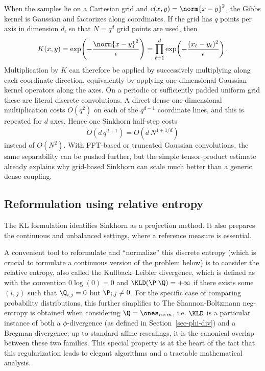 \begin{rem}\label{rem-sinkhorn-separable-gaussian}
	When the samples lie on a Cartesian grid and $c(x,y)=\norm{x-y}^2$, the Gibbs kernel is Gaussian and factorizes along coordinates. If the grid has $q$ points per axis in dimension $d$, so that $N=q^d$ grid points are used, then
	\[
		K(x,y)=\exp\!\left(-\frac{\norm{x-y}^2}{\epsilon}\right)
		=
		\prod_{\ell=1}^d
		\exp\!\left(-\frac{(x_\ell-y_\ell)^2}{\epsilon}\right).
	\]
	Multiplication by $K$ can therefore be applied by successively multiplying along each coordinate direction, equivalently by applying one-dimensional Gaussian kernel operators along the axes. On a periodic or sufficiently padded uniform grid these are literal discrete convolutions. A direct dense one-dimensional multiplication costs $O(q^2)$ on each of the $q^{d-1}$ coordinate lines, and this is repeated for $d$ axes. Hence one Sinkhorn half-step costs
	\[
		O(d\,q^{d+1})=O(d\,N^{1+1/d})
	\]
	instead of $O(N^2)$. With FFT-based or truncated Gaussian convolutions, the same separability can be pushed further, but the simple tensor-product estimate already explains why grid-based Sinkhorn can scale much better than a generic dense coupling.
\end{rem}


\subsection{Reformulation using relative entropy}

The KL formulation identifies Sinkhorn as a projection method. It also prepares the continuous and unbalanced settings, where a reference measure is essential.

A convenient tool to reformulate and ``normalize'' this discrete entropy (which is crucial to formulate a continuous version of the problem below) is to consider the relative entropy, also called the Kullback--Leibler divergence, which is defined as
with the convention $0\log(0)=0$ and $\KLD(\P|\Q)=+\infty$ if there exists some $(i,j)$ such that $\Q_{i,j}=0$ but $\P_{i,j} \neq 0$.
%
For the specific case of comparing probability distributions, this further simplifies to
The Shannon-Boltzmann neg-entropy is obtained when considering $\Q=\ones_{n \times m}$, i.e.
$\KLD$ is a particular instance of both a $\phi$-divergence (as defined in Section~\ref{sec-phi-div}) and a Bregman divergence; up to standard affine rescalings, it is the canonical overlap between these two families. This special property is at the heart of the fact that this regularization leads to elegant algorithms and a tractable mathematical analysis.

